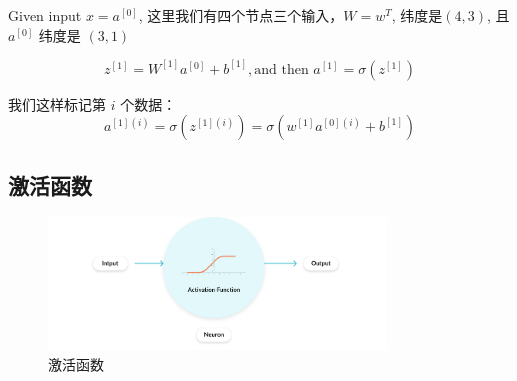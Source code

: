 \documentclass[cn,hazy,blue,11pt,normal]{elegantnote}
\begin{document}
Given input $x=a^{[0]}$, 这里我们有四个节点三个输入，$W=w^{T}$, 纬度是$(4,3)$, 且 $a^{[0]}$ 纬度是 $(3,1)$

\[
    z^{[1]} = W^{[1]}a^{[0]}+b^{[1]}, \text{and then } a^{[1]}=\sigma(z^{[1]})
\]

我们这样标记第 $i$ 个数据：
\[
	a^{[1](i)} = \sigma(z^{[1](i)}) = \sigma(w^{[1]}a^{[0](i)}+b^{[1]})
\]

\subsection{激活函数}
\begin{figure}[H] %
    \centering
    \includegraphics[width=0.8\textwidth]{./fig/激活函数.png}
    \caption{激活函数}
    \label{fig:激活函数}
\end{figure}
\end{document}
